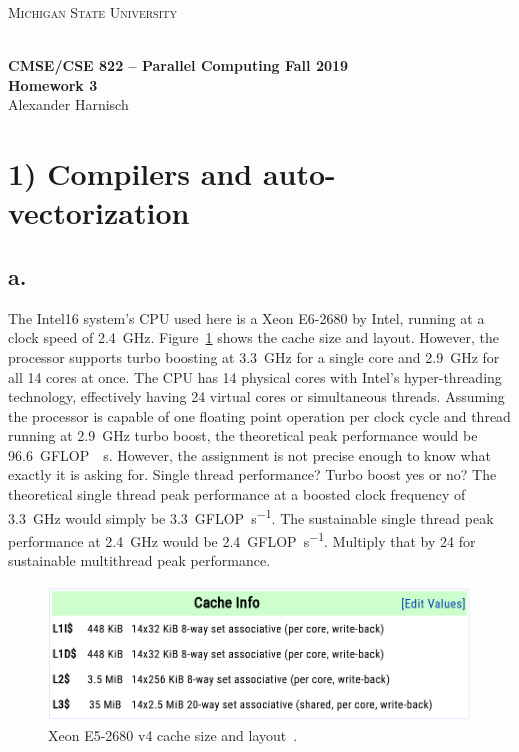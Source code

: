 \documentclass[a4paper, 11pt]{article}
\begin{document}
\noindent
\centerline{\small{\textsc{Michigan State University}}} \\
\large{\textbf{CMSE/CSE 822 – Parallel Computing \hfill Fall 2019 \\
Homework 3}} \\
Alexander Harnisch \\
\noindent\makebox[\linewidth]{\rule{\textwidth}{0.4pt}}

\section*{1) Compilers and auto-vectorization}
\subsection*{a.}
\label{sec:1a}
The Intel16 system's CPU used here is a Xeon E6-2680 by Intel, running at a
clock speed of \SI{2.4}{\giga\hertz}. Figure~\ref{fig:cache_table} shows the
cache size and layout. However, the processor supports turbo boosting at
\SI{3.3}{\giga\hertz} for a single core and \SI{2.9}{\giga\hertz} for all 14
cores at once. The CPU has 14 physical cores with Intel's hyper-threading
technology, effectively having 24 virtual cores or simultaneous threads.
Assuming the processor is capable of one floating point operation per clock
cycle and thread running at \SI{2.9}{\giga\hertz} turbo boost, the theoretical
peak performance would be \SI{96.6}{\giga FLOP \per\second}. However, the
assignment is not precise enough to know what exactly it is asking for. Single
thread performance? Turbo boost yes or no? The theoretical single thread peak
performance at a boosted clock frequency of \SI{3.3}{\giga\hertz} would simply
be \SI{3.3}{\giga FLOP\per\second}. The sustainable single thread peak
performance at \SI{2.4}{\giga\hertz} would be \SI{2.4}{\giga FLOP\per\second}.
Multiply that by 24 for sustainable multithread peak performance. 
\begin{figure}
  \centering
  \includegraphics[width=.7\textwidth]{./cache_table.png}
  \caption{Xeon E5-2680 v4 cache size and layout~\cite{wikichip}.}
  \label{fig:cache_table}
\end{figure}
\end{document}
